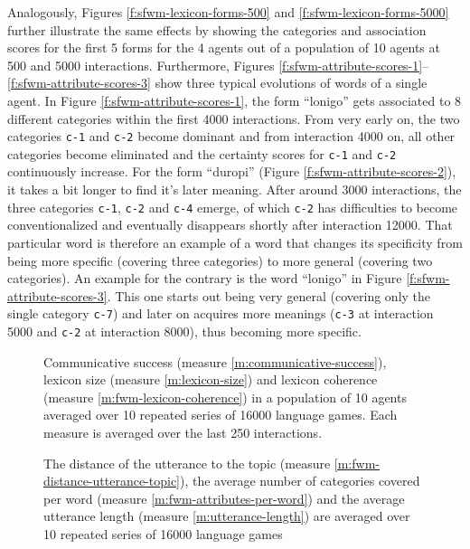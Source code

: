 Analogously, Figures \ref{f:sfwm-lexicon-forms-500} and
\ref{f:sfwm-lexicon-forms-5000} further illustrate the same effects by
showing the categories and association scores for the first 5 forms
for the 4 agents out of a population of 10 agents at 500 and 5000
interactions. Furthermore, Figures
\ref{f:sfwm-attribute-scores-1}--\ref{f:sfwm-attribute-scores-3} show
three typical evolutions of words of a single agent. In Figure
\ref{f:sfwm-attribute-scores-1}, the form ``lonigo'' gets associated
to 8 different categories within the first 4000 interactions. From
very early on, the two categories \texttt{c-1} and \texttt{c-2} become
dominant and from interaction 4000 on, all other categories become
eliminated and the certainty scores for \texttt{c-1} and \texttt{c-2}
continuously increase. For the form ``duropi'' (Figure
\ref{f:sfwm-attribute-scores-2}), it takes a bit longer to find it's
later meaning. After around 3000 interactions, the three categories
\texttt{c-1}, \texttt{c-2} and \texttt{c-4} emerge, of which
\texttt{c-2} has difficulties to become conventionalized and
eventually disappears shortly after interaction 12000. That particular
word is therefore an example of a word that changes its specificity
from being more specific (covering three categories) to more general
(covering two categories). An example for the contrary is the word
``lonigo'' in Figure \ref{f:sfwm-attribute-scores-3}. This one starts
out being very general (covering only the single category
\texttt{c-7}) and later on acquires more meanings (\texttt{c-3} at
interaction 5000 and \texttt{c-2} at interaction 8000), thus becoming
more specific.


\startfiguregroup

\begin{figure}[t]
  \caption{Comm\-unicative success (measure
    \ref{m:communicative-success}), lexicon size (measure
    \ref{m:lexicon-size}) and lexicon coherence (measure
    \ref{m:fwm-lexicon-coherence}) in a population of 10 agents averaged
    over 10 repeated series of 16000 language games. Each measure is
    averaged over the last 250 interactions. }
  \label{f:sfwm-success+lexicon-size+coherence}
\end{figure}


\begin{figure}[t]
  \caption{The distance of the utterance to the topic (measure
    \ref{m:fwm-distance-utterance-topic}), the average number of
    categories covered per word (measure
    \ref{m:fwm-attributes-per-word}) and the average utterance length
    (measure \ref{m:utterance-length}) are averaged over 10 repeated
    series of 16000 language games}
  \label{f:sfwm-lexicon}
\end{figure}

